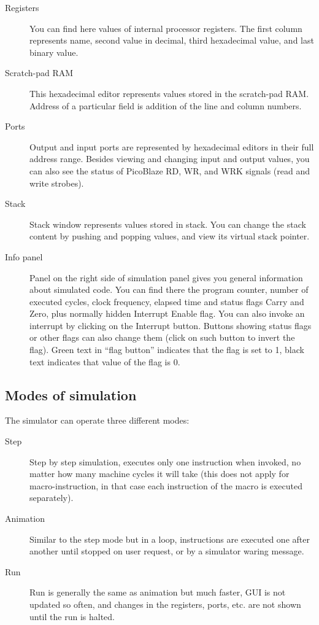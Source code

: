     \begin{description}
        \item [Registers]
            You can find here values of internal processor registers. The first column represents name, second value in decimal, third hexadecimal value, and last binary value.
        \item [Scratch-pad RAM]
            This hexadecimal editor represents values stored in the scratch-pad RAM. Address of a particular field is addition of the line and column numbers.
        \item [Ports]
            Output and input ports are represented by hexadecimal editors in their full address range. Besides viewing and changing input and output values, you can also see the status of PicoBlaze RD, WR, and WRK signals (read and write strobes).
        \item [Stack]
            Stack window represents values stored in stack. You can change the stack content by pushing and popping values, and view its virtual stack pointer.
        \item [Info panel]
            Panel on the right side of simulation panel gives you general information about simulated code. You can find there the program counter, number of executed cycles, clock frequency, elapsed time and status flags Carry and Zero, plus normally hidden Interrupt Enable flag. You can also invoke an interrupt by clicking on the Interrupt button. Buttons showing status flags or other flags can also change them (click on such button to invert the flag). Green text in ``flag button'' indicates that the flag is set to 1, black text indicates that value of the flag is 0.
    \end{description}

    \subsection{Modes of simulation}
        The simulator can operate three different modes:
        \begin{description}
            \item [Step]
                Step by step simulation, executes only one instruction when invoked, no matter how many machine cycles it will take (this does not apply for macro-instruction, in that case each instruction of the macro is executed separately).
            \item [Animation]
                Similar to the step mode but in a loop, instructions are executed one after another until stopped on user request, or by a simulator waring message.
            \item [Run]
                Run is generally the same as animation but much faster, GUI is not updated so often, and changes in the registers, ports, etc. are not shown until the run is halted.
        \end{description}

